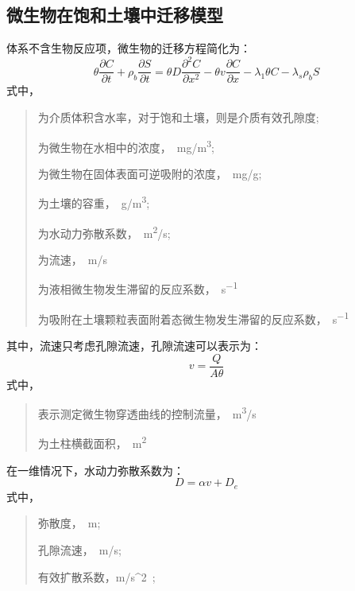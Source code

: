 \documentclass[a4paper,cs4size,adobefonts,fancyhdr]{ctexart}[2005/11/25]
\newcommand{\upcite}[1]{\textsuperscript{\textsuperscript{\cite{#1}}}}
\numberwithin{equation}{section} %
\begin{document}
\subsection{微生物在饱和土壤中迁移模型}
体系不含生物反应项，微生物的迁移方程简化为\upcite{杨德军2009}：
	\begin{equation}\label{qianyif}
	\theta\dfrac{\partial C}{\partial t}+\rho_b\dfrac{\partial S}{\partial t}
	=\theta D\dfrac{\partial^2 C}{\partial x^2}-\theta v\dfrac{\partial C}{\partial x}
	-\lambda_1\theta C-\lambda_s\rho_b S
	\end{equation}
式中，
	\begin{quote}
	\begin{description}\setlength{\itemsep}{0em}
	\item[$\theta$]为介质体积含水率，对于饱和土壤，则是介质有效孔隙度;
	\item[$C$]为微生物在水相中的浓度，\SI{}{mg/m^3};
	\item[$S$]为微生物在固体表面可逆吸附的浓度，\SI{}{mg/g};
	\item[$\rho_b$]为土壤的容重，\SI{}{g/m^3};
	\item[$D$]为水动力弥散系数，\SI{}{m^2/s};
	\item[$v$]为流速，\SI{}{m/s}
	\item[$\lambda_l$]为液相微生物发生滞留的反应系数，\SI{}{s^{-1}}
	\item[$\lambda_s$]为吸附在土壤颗粒表面附着态微生物发生滞留的反应系数，\SI{}{s^{-1}}
	\end{description}
	\end{quote}\par
其中，流速只考虑孔隙流速，孔隙流速可以表示为：
\begin{equation}
	v=\dfrac{Q}{A\theta}
\end{equation}
式中，
	\begin{quote}
	\begin{description}\setlength{\itemsep}{0em}
	\item[$Q$]表示测定微生物穿透曲线的控制流量，\SI{}{m^3/s}
	\item[$A$]为土柱横截面积，\SI{}{m^2}
	\end{description}
	\end{quote}\par
在一维情况下，水动力弥散系数为：
\begin{equation}
	D=\alpha v+D_e
\end{equation}
式中，
\begin{quote}
\unskip
\begin{description}\setlength{\itemsep}{0em}
	\item[$\alpha$]弥散度，\SI{}{m};
	\item[$v$]孔隙流速，\SI{}{m/s};
	\item[$D_e$]有效扩散系数，\SI{m/s^2};
\end{description}\par
\ignorespaces
\end{quote}
\end{document}
